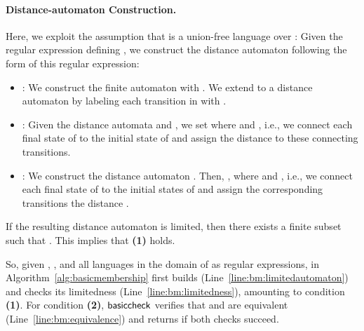 \documentclass[envcountsame]{llncs}
\newcommand{\basiccheck}{\ensuremath{{\sf basiccheck}}\xspace}
\begin{document}
\paragraph{Distance-automaton Construction.}
Here, we exploit the assumption that  is a union-free language
over :
Given the regular expression defining , we construct the distance
automaton  following the form of this regular expression:
\begin{itemize}
\item : We construct the finite automaton 
  with .  We extend  to a
  distance automaton by labeling each transition in 
  with .
\item : Given the distance automata  and , we set  where  and , i.e., we connect each final
  state of  to the initial state of  and assign the
  distance  to these connecting transitions.
\item : We construct the distance automaton .  Then,
  , where  and , i.e., we connect each final state of  to the
  initial states of  and assign the corresponding transitions
  the distance .
\end{itemize}
If the resulting distance automaton  is limited, then there
exists a finite subset  such that .
This implies that {\bfseries(1)} holds.



\begin{algorithm}[tbp]
  \Requires{}

  \Build \;\label{line:bm:limitedautomaton}
  \Return \;
  \caption{}
  \label{alg:basicmembership}
\end{algorithm}


So, given , , and all languages in the domain of  as
regular expressions,  in
Algorithm~\ref{alg:basicmembership} first builds 
(Line~\ref{line:bm:limitedautomaton}) and checks its limitedness
(Line~\ref{line:bm:limitedness}), amounting to condition
{\bfseries(1)}.
For condition {\bfseries(2)}, \basiccheck verifies that 
and  are equivalent (Line~\ref{line:bm:equivalence}) and returns
 if both checks succeed.
\end{document}
